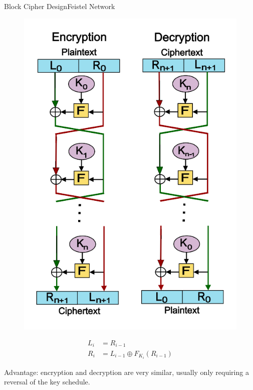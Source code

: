 \documentclass[12pt]{beamer}
\begin{document}
\begin{frame}{Block Cipher Design}{Feistel Network}
	\centering
	\begin{minipage}{0.45\textwidth}
		\begin{figure}[h!]
			\centering
			\includegraphics[width=\textwidth,height=0.8\textheight,keepaspectratio]{feistel-structure}
		\end{figure}
	\end{minipage}
	\begin{minipage}{0.45\textwidth}
		\begin{align*}
			L_i &= R_{i-1} \\
			R_i &= L_{i-1} \oplus F_{K_i}(R_{i-1})
		\end{align*}

		Advantage: encryption and decryption are very similar,
		usually only requiring a reversal of the key schedule.
	\end{minipage}

\end{frame}
\end{document}
